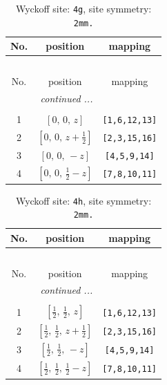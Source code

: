 \documentclass[fleqn,8pt]{jsarticle}
\begin{document}
\begin{longtable}{ccc}
\caption{Wyckoff site: {\tt 4g}, site symmetry: {\tt 2mm.}}
 \\
 \hline \hline
No. & position & mapping \\ \hline \endfirsthead

\multicolumn{2}{l}{\tablename\ \thetable{}} \\
 \hline \hline
No. & position & mapping \\ \hline \endhead

 \hline \hline
\multicolumn{2}{r}{\footnotesize\it continued ...} \\ \endfoot

 \hline \hline
\multicolumn{2}{r}{} \\ \endlastfoot

1 & $\left[ 0,\, 0,\, z \right]$ & {\tt [1,6,12,13]} \\ \hline
2 & $\left[ 0,\, 0,\, z + \frac{1}{2} \right]$ & {\tt [2,3,15,16]} \\ \hline
3 & $\left[ 0,\, 0,\, - z \right]$ & {\tt [4,5,9,14]} \\ \hline
4 & $\left[ 0,\, 0,\, \frac{1}{2} - z \right]$ & {\tt [7,8,10,11]} \\
\end{longtable}
\renewcommand{\arraystretch}{1.2}
\begin{longtable}{ccc}
\caption{Wyckoff site: {\tt 4h}, site symmetry: {\tt 2mm.}}
 \\
 \hline \hline
No. & position & mapping \\ \hline \endfirsthead

\multicolumn{2}{l}{\tablename\ \thetable{}} \\
 \hline \hline
No. & position & mapping \\ \hline \endhead

 \hline \hline
\multicolumn{2}{r}{\footnotesize\it continued ...} \\ \endfoot

 \hline \hline
\multicolumn{2}{r}{} \\ \endlastfoot

1 & $\left[ \frac{1}{2},\, \frac{1}{2},\, z \right]$ & {\tt [1,6,12,13]} \\ \hline
2 & $\left[ \frac{1}{2},\, \frac{1}{2},\, z + \frac{1}{2} \right]$ & {\tt [2,3,15,16]} \\ \hline
3 & $\left[ \frac{1}{2},\, \frac{1}{2},\, - z \right]$ & {\tt [4,5,9,14]} \\ \hline
4 & $\left[ \frac{1}{2},\, \frac{1}{2},\, \frac{1}{2} - z \right]$ & {\tt [7,8,10,11]} \\
\end{longtable}
\end{document}
